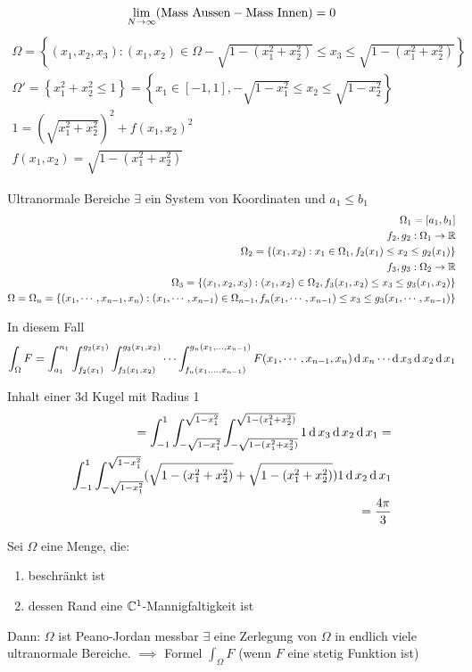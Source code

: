 \[\displaystyle\lim_{N\rightarrow\infty}(\text{Mass Aussen} - \text{Mass Innen})=0\]
\begin{eqnarray*}
  \Omega=\left\{ (x_1,x_2,x_3):(x_1,x_2)\in\Omega - \sqrt{1-(x_1^2+x_2^2)}\leq x_3\leq \sqrt{1-(x_1^2+x_2^2)} \right\}\\
  \Omega'=\left\{ x_1^2+x_2^2\leq 1 \right\}=\left\{ x_1\in[-1,1],-\sqrt{1-x_1^2}\leq x_2\leq\sqrt{1-x_2^2} \right\}\\
  1=\left( \sqrt{x_1^2+x_2^2} \right)^2+f(x_1,x_2)^2\\
  f(x_1,x_2)=\sqrt{1-(x_1^2+x_2^2)}
\end{eqnarray*}
\begin{Def}
  Ultranormale Bereiche $\exists$ ein System von Koordinaten und $a_1\leq b_1$
  \begin{eqnarray*}
    \Omega_1=\left[ a_1,b_1 \right]\\
    f_2,g_2:\Omega_1\rightarrow\mathbb{R}\\
    \Omega_2=\left\{ (x_1,x_2):x_1\in \Omega_1, f_2(x_1)\leq x_2\leq g_2(x_1) \right\}\\
    f_3,g_3:\Omega_2\rightarrow\mathbb{R}\\
    \Omega_3=\left\{ (x_1,x_2,x_3):(x_1,x_2)\in \Omega_2, f_3(x_1,x_2)\leq x_3\leq g_3(x_1,x_2) \right\}\\
    \Omega=\Omega_n=\left\{ (x_1,\cdots,x_{n-1},x_n):(x_1,\cdots,x_{n-1})\in \Omega_{n-1}, f_n(x_1,\cdots,x_{n-1})\leq x_3\leq g_3(x_1,\cdots,x_{n-1}) \right\}\\
  \end{eqnarray*}
\end{Def}
\begin{Bem}
  In diesem Fall
  \[\int_\Omega F=\int_{a_1}^{n_1}\int_{f_2(x_1)}^{g_2(x_1)}\int_{f_3(x_1,x_2)}^{g_3(x_1,x_2)}\cdots\int_{f_n(x_1,\ldots,x_{n-1})}^{g_n(x_1,\ldots,x_{n-1})}F(x_1,\cdots,x_{n-1},x_n)\operatorname{d} x_n\cdots\operatorname{d} x_3\operatorname{d} x_2\operatorname{d} x_1\]
\end{Bem}
\begin{Bsp}
  Inhalt einer 3d Kugel mit Radius 1
  \begin{eqnarray*}
    =\int_{-1}^1\int_{-\sqrt{1-x_1^2}}^{\sqrt{1-x_1^2}}\int_{-\sqrt{1-(x_1^2+x_2^2)}}^{\sqrt{1-(x_1^2+x_2^2)}} 1\operatorname{d} x_3\operatorname{d} x_2\operatorname{d} x_1 =\\
    \int_{-1}^1\int_{-\sqrt{1-x_1^2}}^{\sqrt{1-x_1^2}}(\sqrt{1-(x_1^2+x_2^2)}+\sqrt{1-(x_1^2+x_2^2)}) 1\operatorname{d} x_2\operatorname{d} x_1\\
    = \frac{4\pi}{3}
  \end{eqnarray*}
\end{Bsp}
\begin{Sat}
  Sei $\Omega$ eine Menge, die:
  \begin{enumerate}
    \item beschränkt ist
    \item dessen Rand eine $\mathbb{C}^1$-Mannigfaltigkeit ist
  \end{enumerate}
  Dann: $\Omega$ ist Peano-Jordan messbar $\exists$ eine Zerlegung von $\Omega$ in endlich viele ultranormale Bereiche.
  $\implies$ Formel $\int_\Omega F$ (wenn $F$ eine stetig Funktion ist)
\end{Sat}
